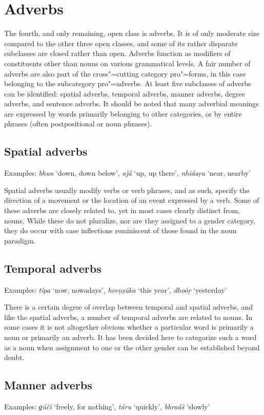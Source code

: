 \section{Adverbs}
\label{sec:3b-5}
The fourth, and only remaining, open class is adverbs. It is of only moderate size compared to the other three open classes, and some of its rather disparate subclasses are closed rather than open. Adverbs function as modifiers of constituents other than nouns on various grammatical levels. A fair number of adverbs are also part of the cross"=cutting category pro"=forms, in this case belonging to the subcategory pro"=adverbs. At least five subclasses of adverbs can be identified: spatial adverbs, temporal adverbs, manner adverbs, degree adverbs, and sentence adverbs. It should be noted that many adverbial meanings are expressed by words primarily belonging to other categories, or by entire phrases (often postpositional or noun phrases).


\subsection{Spatial adverbs}
\label{subsec:3b-5-1}
Examples: \textit{bhun} `down, down below', \textit{aǰá} `up, up there', \textit{nhiáaṛa} `near, nearby'


Spatial adverbs usually modify verbs or verb phrases, and as such, specify the direction of a movement or the location of an event expressed by a verb. Some of these adverbs are closely related to, yet in most cases clearly distinct from, nouns. While these do not pluralize, nor are they assigned to a gender category, they do occur with case inflections reminiscent of those found in the noun paradigm. 


\subsection{Temporal adverbs}
\label{subsec:3b-5-2}
Examples: \textit{típa} `now, nowadays', \textit{heeṇṣúka} `this year', \textit{dhoóṛ} `yesterday'


There is a certain degree of overlap between temporal and spatial adverbs, and like the spatial adverbs, a number of temporal adverbs are related to nouns. In some cases it is not altogether obvious whether a particular word is primarily a noun or primarily an adverb. It has been decided here to categorize such a word as a noun when assignment to one or the other gender can be established beyond doubt.


\subsection{Manner adverbs}
\label{subsec:3b-5-3}
Examples: \textit{ɡúči} `freely, for nothing', \textit{táru} `quickly', \textit{bhraáš} `slowly'


